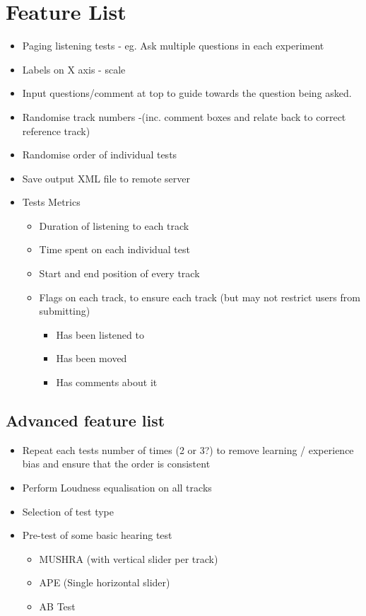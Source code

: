 \documentclass{article}
\begin{document}
\section{Feature List}
\begin{itemize}
\item Paging listening tests - eg. Ask multiple questions in each experiment
\item Labels on X axis - scale
\item Input questions/comment at top to guide towards the question being asked.
\item Randomise track numbers -(inc. comment boxes and relate back to correct reference track)
\item Randomise order of individual tests
\item Save output XML file to remote server
\item Tests Metrics
\begin{itemize}
\item Duration of listening to each track
\item Time spent on each individual test
\item Start and end position of every track
\item Flags on each track, to ensure each track (but may not restrict users from submitting)
\begin{itemize}
\item Has been listened to 
\item Has been moved
\item Has comments about it
\end{itemize}
\end{itemize}
\end{itemize}

\subsection{Advanced feature list}
\begin{itemize}
\item Repeat each tests number of times (2 or 3?) to remove learning / experience bias and ensure that the order is consistent
\item Perform Loudness equalisation on all tracks
\item Selection of test type
\item Pre-test of some basic hearing test
\begin{itemize}
\item MUSHRA (with vertical slider per track)
\item APE (Single horizontal slider)
\item AB Test
\end{itemize}
\end{itemize}
\end{document}
